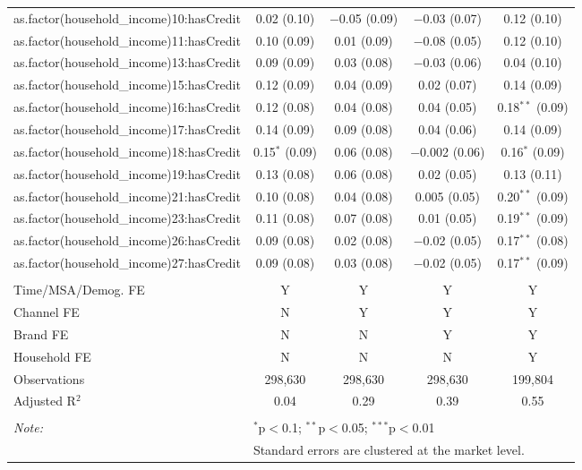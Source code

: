 \begin{table}[!htbp]
\begin{tabular}{@{\extracolsep{5pt}}lcccc}
  as.factor(household\_income)10:hasCredit & 0.02 (0.10) & $-$0.05 (0.09) & $-$0.03 (0.07) & 0.12 (0.10) \\ 
  as.factor(household\_income)11:hasCredit & 0.10 (0.09) & 0.01 (0.09) & $-$0.08 (0.05) & 0.12 (0.10) \\ 
  as.factor(household\_income)13:hasCredit & 0.09 (0.09) & 0.03 (0.08) & $-$0.03 (0.06) & 0.04 (0.10) \\ 
  as.factor(household\_income)15:hasCredit & 0.12 (0.09) & 0.04 (0.09) & 0.02 (0.07) & 0.14 (0.09) \\ 
  as.factor(household\_income)16:hasCredit & 0.12 (0.08) & 0.04 (0.08) & 0.04 (0.05) & 0.18$^{**}$ (0.09) \\ 
  as.factor(household\_income)17:hasCredit & 0.14 (0.09) & 0.09 (0.08) & 0.04 (0.06) & 0.14 (0.09) \\ 
  as.factor(household\_income)18:hasCredit & 0.15$^{*}$ (0.09) & 0.06 (0.08) & $-$0.002 (0.06) & 0.16$^{*}$ (0.09) \\ 
  as.factor(household\_income)19:hasCredit & 0.13 (0.08) & 0.06 (0.08) & 0.02 (0.05) & 0.13 (0.11) \\ 
  as.factor(household\_income)21:hasCredit & 0.10 (0.08) & 0.04 (0.08) & 0.005 (0.05) & 0.20$^{**}$ (0.09) \\ 
  as.factor(household\_income)23:hasCredit & 0.11 (0.08) & 0.07 (0.08) & 0.01 (0.05) & 0.19$^{**}$ (0.09) \\ 
  as.factor(household\_income)26:hasCredit & 0.09 (0.08) & 0.02 (0.08) & $-$0.02 (0.05) & 0.17$^{**}$ (0.08) \\ 
  as.factor(household\_income)27:hasCredit & 0.09 (0.08) & 0.03 (0.08) & $-$0.02 (0.05) & 0.17$^{**}$ (0.09) \\ 
 \hline \\[-1.8ex] 
Time/MSA/Demog. FE & Y & Y & Y & Y \\ 
Channel FE & N & Y & Y & Y \\ 
Brand FE & N & N & Y & Y \\ 
Household FE & N & N & N & Y \\ 
Observations & 298,630 & 298,630 & 298,630 & 199,804 \\ 
Adjusted R$^{2}$ & 0.04 & 0.29 & 0.39 & 0.55 \\ 
\hline 
\hline \\[-1.8ex] 
\textit{Note:}  & \multicolumn{4}{l}{$^{*}$p$<$0.1; $^{**}$p$<$0.05; $^{***}$p$<$0.01} \\ 
 & \multicolumn{4}{l}{Standard errors are clustered at the market level.} \\ 
\end{tabular} 
\end{table} 

